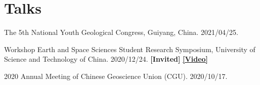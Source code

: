 \section{Talks}


\begin{etaremune}
\item
    The 5th National Youth Geological Congress, Guiyang, China.
    2021/04/25.
\item
    Workshop Earth and Space Sciences Student Research Symposium, University of Science and Technology of China.
    2020/12/24. {\bf [Invited]} {\bf\href{http://wlkt.ustc.edu.cn/video/detail_5382_25187.htm}{[Video]}}
\item
    2020 Annual Meeting of Chinese Geoscience Union (CGU).
    2020/10/17.
\end{etaremune}
